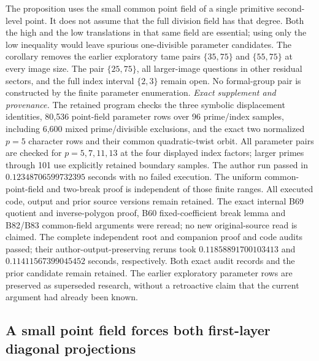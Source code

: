 \begin{remark}
\label{rem:B-RD84-scope}
The proposition uses the small common point field of a
single primitive second-level point. It does not assume
that the full division field has that degree. Both the
high and the low translations in that same field are
essential; using only the low inequality would leave
spurious one-divisible parameter candidates.
The corollary removes the earlier exploratory tame pairs
\(\{35,75\}\) and \(\{55,75\}\) at every image size.
The pair \(\{25,75\}\), all larger-image questions in
other residual sectors, and the full index interval
\(\{2,3\}\) remain open. No formal-group pair is
constructed by the finite parameter enumeration.
\smallskip
\noindent\emph{Exact supplement and provenance.}
The retained program
checks the three symbolic displacement identities,
80,536 point-field parameter rows over 96 prime/index
samples, including 6,600 mixed prime/divisible exclusions,
and the exact two normalized \(p=5\) character rows and
their common quadratic-twist orbit. All parameter pairs
are checked for \(p=5,7,11,13\) at the four displayed
index factors; larger primes through 101 use explicitly
retained boundary samples. The author run passed in
\(0.12348706599732395\) seconds with no failed execution.
The uniform common-point-field and two-break proof is
independent of those finite ranges. All executed code,
output and prior source versions remain retained.
The exact internal B69 quotient and inverse-polygon proof,
B60 fixed-coefficient break lemma and B82/B83 common-field
arguments were reread; no new original-source read is
claimed.
The complete independent root and companion proof and code
audits passed; their author-output-preserving reruns took
\(0.11858891700103413\) and
\(0.11411567399045452\) seconds, respectively.
Both exact audit records and the prior candidate remain
retained. The earlier exploratory parameter rows are
preserved as superseded research, without a retroactive
claim that the current argument had already been known.
\end{remark}


\subsection{A small point field forces both first-layer diagonal projections}

